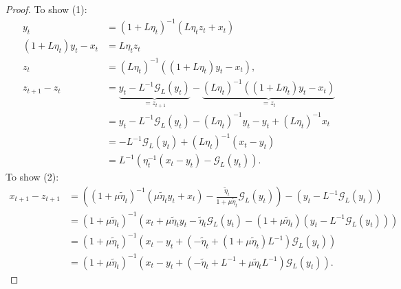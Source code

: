 \documentclass[12pt]{article}
\begin{document}
\begin{proof}
            To show (1): 
            \begin{align*}
                y_{t} &= (1 + L\eta_{t})^{-1}(L\eta_{t}z_{t} + x_{t})
                \\
                (1 + L\eta_t)y_t - x_t &= L\eta_t z_t
                \\
                z_t & = (L\eta_t)^{-1}((1 + L\eta_t)y_t - x_t), 
                \\[1em]
                z_{t + 1} - z_t 
                &= \underbrace{ y_t - L^{-1}\mathcal G_L(y_t)}_{=z_{t + 1}}
                - \underbrace{(L\eta_t)^{-1}((1 + L\eta_t)y_t - x_t)}_{=z_t}
                \\
                &= 
                y_t - L^{-1} \mathcal G_L(y_t) - (L\eta_t)^{-1}y_t - y_t + (L\eta_t)^{-1} x_t
                \\
                &= 
                -L^{-1}\mathcal G_L(y_t) + (L\eta_t)^{-1}(x_t - y_t)
                \\
                &= 
                L^{-1}(\eta_t^{-1}(x_t - y_t) -\mathcal G_L(y_t)). 
            \end{align*}
            To show (2): 
            \begin{align*}
                x_{t + 1} - z_{t + 1}&= 
                \left(
                    (1 + \mu \tilde \eta_{t})^{-1} (\mu \tilde \eta_{t }y_t + x_t)
                    - \frac{\tilde \eta_{t }}{1 + \mu\tilde \eta_{t }}
                    \mathcal G_L(y_t)
                \right) - \left(
                    y_t - L^{-1}\mathcal G_L(y_t)
                \right)
                \\
                &= 
                (1 + \mu \tilde \eta_{t})^{-1}
                \left(
                    x_t + \mu \tilde \eta_{t} y_t
                    - \tilde \eta_{t} \mathcal G_L(y_t)
                    - (1 + \mu \tilde \eta_{t})
                    (y_t - L^{-1}\mathcal G_L(y_t))
                \right)
                \\
                &= 
                (1 + \mu\tilde \eta_{t})^{-1}
                \left(
                    x_t - y_t + 
                    (
                        -\tilde \eta_{t} + 
                        (1 + \mu\tilde \eta_{t})L^{-1}
                    )
                    \mathcal G_L(y_t)
                \right)
                \\
                &= 
                (1 + \mu\tilde \eta_{t})^{-1}
                \left(
                    x_t - y_t +     
                    (
                        - \tilde \eta_{t} + L^{-1}
                        + \mu \tilde \eta_{t}L^{-1}
                    )
                    \mathcal G_L(y_t)
                \right). 
            \end{align*}
        \end{proof}
\end{document}
